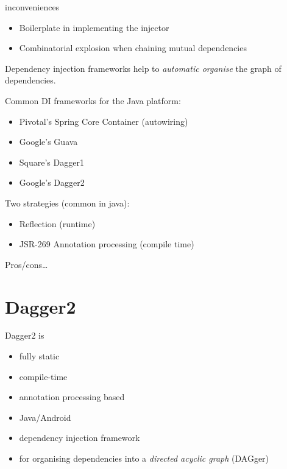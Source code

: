 \documentclass[10pt]{beamer}
\begin{document}
\begin{frame}[fragile]
	\begin{alertblock}{inconveniences}
		\begin{itemize}
			\item Boilerplate in implementing the injector 
			\item 
		Combinatorial explosion when chaining mutual dependencies
		\end{itemize}
	\end{alertblock}
\end{frame}

\begin{frame}
	Dependency injection frameworks help to \emph{automatic organise} the graph of dependencies. 

	Common DI frameworks for the Java platform:
	\begin{itemize}
		\item Pivotal's Spring Core Container (autowiring) 
		\item Google's Guava 
		\item Square's Dagger1
		\item Google's Dagger2
	\end{itemize}
\end{frame}

\begin{frame}
	Two strategies (common in java):
	\begin{itemize}
		\item Reflection (runtime) 
		\item JSR-269 Annotation processing (compile time)
	\end{itemize}

	Pros/cons\ldots 
\end{frame}

	\section{Dagger2}
	\begin{frame}
		Dagger2 is
		\begin{itemize}
			\item fully static 
			\item compile-time 
			\item annotation processing based 
			\item Java/Android
			\item dependency injection framework
			\item for organising dependencies into a \emph{directed acyclic graph
				}	(DAGger)
		\end{itemize}
	\end{frame}
\end{document}
